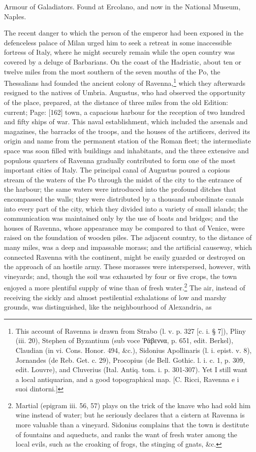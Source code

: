Armour of Galadiators. Found at Ercolano, and now in the National Museum, Naples.

The recent danger to which the person of the emperor had been exposed in the defenceless palace of Milan urged him to seek a retreat in some inaccessible fortress of Italy, where he might securely remain while the open country was covered by a deluge of Barbarians. On the coast of the Hadriatic, about ten or twelve miles from the most southern of the seven mouths of the Po, the Thessalians had founded the ancient colony of Ravenna,\footnote{This account of Ravenna is drawn from Strabo (l. v. p. 327 [c. i. § 7]), Pliny (iii. 20), Stephen of Byzantium (sub voce \textgreek{\texthebrew{Ῥ}άβεννα}, p. 651, edit. Berkel), Claudian (in vi. Cons. Honor. 494, \&c.), Sidonius Apollinaris (l. i. epist. v. 8), Jornandes (de Reb. Get. c. 29), Procopius (de Bell. Gothic. l. i. c. 1, p. 309, edit. Louvre), and Cluverius (Ital. Antiq. tom. i. p. 301-307). Yet I still want a local antiquarian, and a good topographical map. [C. Ricci, Ravenna e i suoi dintorni.]} which they afterwards resigned to the natives of Umbria. Augustus, who had observed the opportunity of the place, prepared, at the distance of three miles from the old Edition: current; Page: [162] town, a capacious harbour for the reception of two hundred and fifty ships of war. This naval establishment, which included the arsenals and magazines, the barracks of the troops, and the houses of the artificers, derived its origin and name from the permanent station of the Roman fleet; the intermediate space was soon filled with buildings and inhabitants, and the three extensive and populous quarters of Ravenna gradually contributed to form one of the most important cities of Italy. The principal canal of Augustus poured a copious stream of the waters of the Po through the midst of the city to the entrance of the harbour; the same waters were introduced into the profound ditches that encompassed the walls; they were distributed by a thousand subordinate canals into every part of the city, which they divided into a variety of small islands; the communication was maintained only by the use of boats and bridges; and the houses of Ravenna, whose appearance may be compared to that of Venice, were raised on the foundation of wooden piles. The adjacent country, to the distance of many miles, was a deep and impassable morass; and the artificial causeway, which connected Ravenna with the continent, might be easily guarded or destroyed on the approach of an hostile army. These morasses were interspersed, however, with vineyards; and, though the soil was exhausted by four or five crops, the town enjoyed a more plentiful supply of wine than of fresh water.\footnote{Martial (epigram iii. 56, 57) plays on the trick of the knave who had sold him wine instead of water; but he seriously declares that a cistern at Ravenna is more valuable than a vineyard. Sidonius complains that the town is destitute of fountains and aqueducts, and ranks the want of fresh water among the local evils, such as the croaking of frogs, the stinging of gnats, \&c.} The air, instead of receiving the sickly and almost pestilential exhalations of low and marshy grounds, was distinguished, like the neighbourhood of Alexandria, as 
